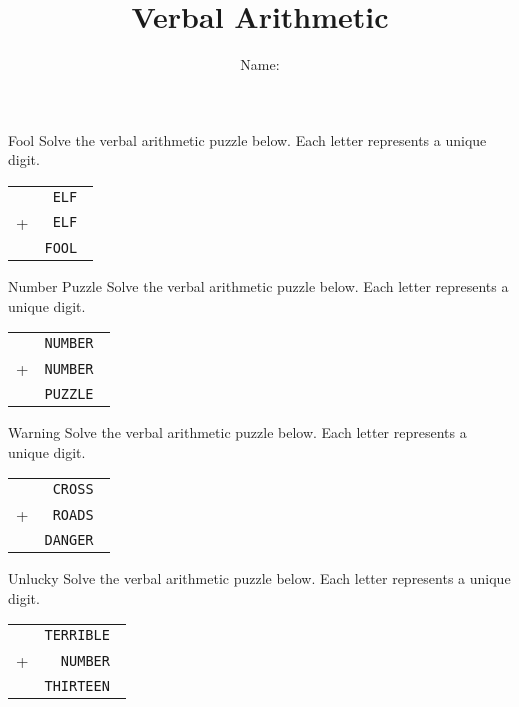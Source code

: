 \documentclass[12pt,letterpaper]{article}
\title{Verbal Arithmetic}
\author{Name: \underline{\hspace{5cm}}}
\begin{document}
\maketitle

\thispagestyle{empty}

\begin{problem}{Fool}
Solve the verbal arithmetic puzzle below. Each letter represents a unique digit.

\begin{center}
 \begin{tabular}{rr}
  & \tt ELF \\
  + & \tt ELF \\
  \hline
  & \tt FOOL
 \end{tabular}
\end{center}
\end{problem}

\begin{problem}{Number Puzzle}
Solve the verbal arithmetic puzzle below. Each letter represents a unique digit.

\begin{center}
 \begin{tabular}{rr}
  & \tt NUMBER \\
  + & \tt NUMBER \\
  \hline
  & \tt PUZZLE
 \end{tabular}
\end{center}
\end{problem}

\begin{problem}{Warning}
Solve the verbal arithmetic puzzle below. Each letter represents a unique digit.

\begin{center}
 \begin{tabular}{rr}
  & \tt CROSS \\
  + & \tt ROADS \\
  \hline
  & \tt DANGER
 \end{tabular}
\end{center}
\end{problem}

\begin{problem}{Unlucky}
Solve the verbal arithmetic puzzle below. Each letter represents a unique digit.

\begin{center}
 \begin{tabular}{rr}
  & \tt TERRIBLE \\
  + & \tt NUMBER \\
  \hline
  & \tt THIRTEEN
 \end{tabular}
\end{center}
\end{problem}
\end{document}
